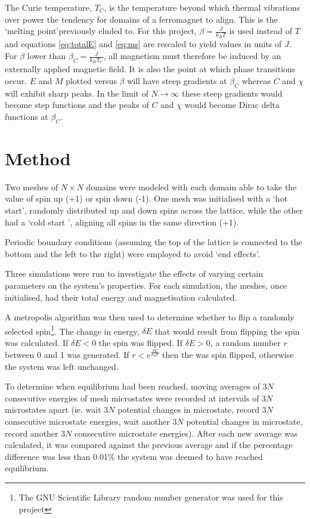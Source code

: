 \documentclass[11pt]{article}   	%
\begin{document}
The Curie temperature, $T_C$, is the temperature beyond which thermal vibrations over power the tendency for domains of a ferromagnet to align. This is the \textquoteleft melting point\textquoteright previously eluded to. For this project, $\beta = \frac{J}{k_B T}$ is used instead of $T$ and equations \ref{eq:totalE} and \ref{eq:ms} are rescaled to yield values in units of $J$. For $\beta$ lower than $\beta_C = \frac{J}{k_B T_C}$, all magnetism must therefore be induced by an externally applied magnetic field. It is also the point at which phase transitions occur. $E$ and $M$ plotted versus $\beta$ will have steep gradients at $\beta_C$ whereas $C$ and $\chi$ will exhibit sharp peaks. In the limit of $N \rightarrow \infty$ these steep gradients would become step functions and the peaks of $C$ and $\chi$ would become Dirac delta functions at $\beta_C$.

\section{Method}
Two meshes of $N \times N$ domains were modeled with each domain able to take the value of spin up (+1) or spin down (-1). One mesh was initialised with a \textquoteleft hot start\textquoteright, randomly distributed up and down spins across the lattice, while the other had a \textquoteleft cold start \textquoteright, aligning all spins in the same direction (+1). %

Periodic boundary conditions (assuming the top of the lattice is connected to the bottom and the left to the right) were employed to avoid \textquoteleft end effects\textquoteright.

Three simulations were run to investigate the effects of varying certain parameters on the system's properties. For each simulation, the meshes, once initialised, had their total energy and magnetisation calculated.

A metropolis algorithm was then used to determine whether to flip a randomly selected spin\footnote{The GNU Scientific Library random number generator was used for this project\cite{gsl}}. The change in energy, $\delta E$ that would result from flipping the spin was calculated. If $\delta E < 0$ the spin was flipped. If $\delta E > 0$, a random number $r$ between 0 and 1 was generated. If $ r < e^{\frac{\delta E}{k_B T}} $ then the was spin flipped, otherwise the system was left unchanged.

To determine when equilibrium had been reached, moving averages of $3N$ consecutive energies of mesh microstates were recorded at intervals of $3N$ microstates apart (ie. wait $3N$ potential changes in microstate, record $3N$ consecutive microstate energies, wait another $3N$ potential changes in microstate, record another $3N$ consecutive microstate energies). After each new average was calculated, it was compared against the previous average and if the percentage difference was less than 0.01\% the system was deemed to have reached equilibrium.
\end{document}
